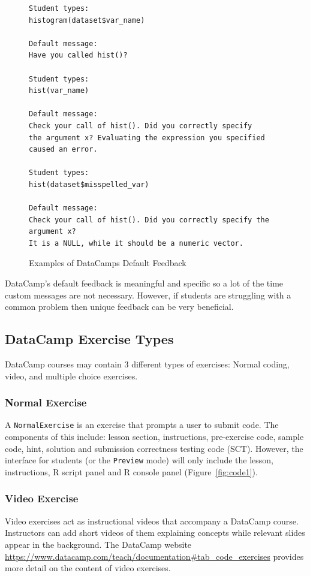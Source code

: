 \documentclass[12pt]{article}\usepackage[]{graphicx}\usepackage[]{color}
\begin{document}
\begin{figure}
\caption{Examples of DataCamps Default Feedback}
\begin{Verbatim}
Student types:
histogram(dataset$var_name)

Default message:
Have you called hist()?

Student types:
hist(var_name)

Default message:
Check your call of hist(). Did you correctly specify 
the argument x? Evaluating the expression you specified
caused an error.

Student types:
hist(dataset$misspelled_var)

Default message:
Check your call of hist(). Did you correctly specify the
argument x? 
It is a NULL, while it should be a numeric vector.

\end{Verbatim}
\end{figure}
DataCamp's default feedback is meaningful and specific so a lot of the time custom 
messages are not necessary.
However, if students are struggling with a common problem then unique feedback can be very beneficial.

\subsection{DataCamp Exercise Types}
DataCamp courses may contain 3 different types of exercises: Normal coding, video, and multiple choice exercises.
\subsubsection{Normal Exercise}
A \texttt{NormalExercise} is an exercise that prompts a user to submit code. The components of this include: lesson section, instructions, pre-exercise code, sample code, hint, solution and submission correctness testing code (SCT). However, the interface for students (or the \texttt{Preview}
mode) will only include the lesson, instructions, R script panel and R console panel (Figure~\ref{fig:code1}).
\subsubsection{Video Exercise}
Video exercises act as instructional videos that accompany a DataCamp course. Instructors can add short videos of them explaining concepts while 
relevant slides appear in the background. The DataCamp website \url{https://www.datacamp.com/teach/documentation#tab_code_exercises} provides 
more detail on the content of video exercises. 
\end{document}
